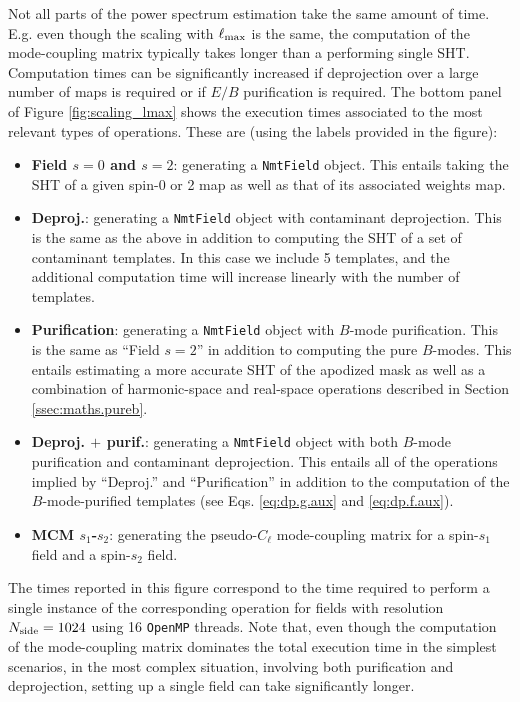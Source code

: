 \documentclass[usenatbib]{mnrasb}
\begin{document}
     Not all parts of the power spectrum estimation take the same amount of time. E.g. even though the scaling with $\ell_{\rm max}$ is the same, the computation of the mode-coupling matrix typically takes longer than a performing single SHT. Computation times can be significantly increased if deprojection over a large number of maps is required or if $E/B$ purification is required. The bottom panel of Figure \ref{fig:scaling_lmax} shows the execution times associated to the most relevant types of operations. These are (using the labels provided in the figure):
     \begin{itemize}
       \item {\bf Field $s=0$ and $s=2$}: generating a {\tt NmtField} object. This entails taking the SHT of a given spin-0 or 2 map as well as that of its associated weights map.
       \item {\bf Deproj.}: generating a {\tt NmtField} object with contaminant deprojection. This is the same as the above in addition to computing the SHT of a set of contaminant templates. In this case we include 5 templates, and the additional computation time will increase linearly with the number of templates.
       \item {\bf Purification}: generating a {\tt NmtField} object with $B$-mode purification. This is the same as ``Field $s=2$'' in addition to computing the pure $B$-modes. This entails estimating a more accurate SHT of the apodized mask as well as a combination of harmonic-space and real-space operations described in Section \ref{ssec:maths.pureb}.
       \item {\bf Deproj. $+$ purif.}: generating a {\tt NmtField} object with both $B$-mode purification and contaminant deprojection. This entails all of the operations implied by ``Deproj.'' and ``Purification'' in addition to the computation of the $B$-mode-purified templates (see Eqs. \ref{eq:dp.g.aux} and \ref{eq:dp.f.aux}).
       \item {\bf MCM $s_1$-$s_2$}: generating the pseudo-$C_\ell$ mode-coupling matrix for a spin-$s_1$ field and a spin-$s_2$ field.
     \end{itemize}
     The times reported in this figure correspond to the time required to perform a single instance of the corresponding operation for fields with resolution $N_{\rm side}=1024$ using 16 \texttt{OpenMP} threads. Note that, even though the computation of the mode-coupling matrix dominates the total execution time in the simplest scenarios, in the most complex situation, involving both purification and deprojection, setting up a single field can take significantly longer.
     
\end{document}

